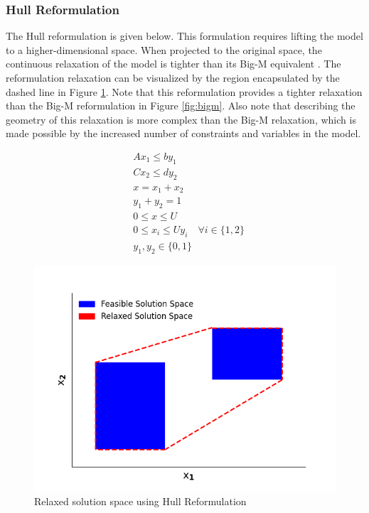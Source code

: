 \documentclass{juliacon}
\begin{document}
\subsubsection{Hull Reformulation}
The Hull reformulation is given below. This formulation requires lifting the model to a higher-dimensional space. When projected to the original space, the continuous relaxation of the model is tighter than its Big-M equivalent \cite{grossmann_trespalacios_2013}. The reformulation relaxation can be visualized by the region encapsulated by the dashed line in Figure \ref{fig:chr}. Note that this reformulation provides a tighter relaxation than the Big-M reformulation in Figure \ref{fig:bigm}. Also note that describing the geometry of this relaxation is more complex than the Big-M relaxation, which is made possible by the increased number of constraints and variables in the model.

\begin{align*}
    & Ax_1 \leq by_1 \\
    & Cx_2 \leq dy_2 \\
    & x = x_1 + x_2 \\ 
    & y_1 + y_2 = 1 \\ 
    & 0 \leq x \leq U \\
    & 0 \leq x_i \leq U y_i \quad \forall i \in \{1,2\} \\
    & y_1, y_2 \in \{0,1\}
\end{align*}

\begin{figure}
    \centering
    \includegraphics[scale=0.5]{chr.png}
    \caption{Relaxed solution space using Hull Reformulation}
    \label{fig:chr}
\end{figure}
\end{document}
